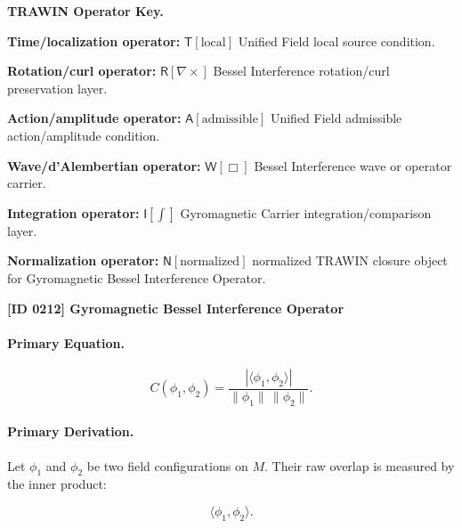 \par\vspace{0.45\baselineskip}
\noindent\begin{minipage}[t]{\linewidth}
\begingroup
\small
\raggedright
\textbf{TRAWIN Operator Key.}\par
\noindent\textbf{Time/localization operator:} $\mathsf{T}\!\left[\mathrm{local}\right]$ Unified Field local source condition.\par
\noindent\textbf{Rotation/curl operator:} $\mathsf{R}\!\left[\nabla\times\right]$ Bessel Interference rotation/curl preservation layer.\par
\noindent\textbf{Action/amplitude operator:} $\mathsf{A}\!\left[\mathrm{admissible}\right]$ Unified Field admissible action/amplitude condition.\par
\noindent\textbf{Wave/d'Alembertian operator:} $\mathsf{W}\!\left[\Box\right]$ Bessel Interference wave or operator carrier.\par
\noindent\textbf{Integration operator:} $\mathsf{I}\!\left[\int\right]$ Gyromagnetic Carrier integration/comparison layer.\par
\noindent\textbf{Normalization operator:} $\mathsf{N}\!\left[\mathrm{normalized}\right]$ normalized TRAWIN closure object for Gyromagnetic Bessel Interference Operator.\par
\endgroup
\end{minipage}

\clearpage
\noindent\textbf{[ID 0212] Gyromagnetic Bessel Interference Operator}\par
\vspace{0.35em}
\paragraph{Primary Equation.}
\begin{equation}
C(\phi_1,\phi_2)
=
\frac{
\left|\langle \phi_1,\phi_2\rangle\right|
}{
\lVert \phi_1\rVert\,\lVert \phi_2\rVert
}.
\end{equation}

\paragraph{Primary Derivation.}
Let $\phi_1$ and $\phi_2$ be two field configurations on $M$.  
Their raw overlap is measured by the inner product:

\begin{equation}
\langle \phi_1,\phi_2\rangle .
\end{equation}

